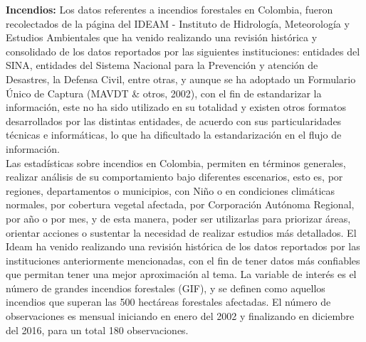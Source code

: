 \documentclass[a4paper]{article}\usepackage[]{graphicx}\usepackage[]{color}
\begin{document}
\textbf{Incendios:} Los datos referentes a incendios forestales en Colombia, fueron recolectados de la página del IDEAM - Instituto de Hidrología, Meteorología y Estudios Ambientales que ha venido realizando una revisión histórica y consolidado de los datos reportados por las siguientes instituciones: entidades del SINA, entidades del Sistema Nacional para la Prevención y atención de Desastres, la Defensa Civil, entre otras, y aunque se ha adoptado un Formulario Único de Captura (MAVDT \& otros, 2002), con el fin de estandarizar la información, este no ha sido utilizado en su totalidad y existen otros formatos desarrollados por las distintas entidades, de acuerdo con sus particularidades técnicas e informáticas, lo que ha dificultado la estandarización en el flujo de información.
\\
Las estadísticas sobre incendios en Colombia, permiten en términos generales, realizar análisis de su comportamiento bajo diferentes escenarios, esto es, por regiones, departamentos o municipios, con Niño o en condiciones climáticas normales,  por cobertura vegetal afectada, por Corporación Autónoma Regional, por año o por mes, y de esta manera, poder ser  utilizarlas para priorizar áreas, orientar acciones o sustentar la necesidad de realizar estudios más detallados. El Ideam ha venido realizando una revisión histórica de los datos reportados por las instituciones anteriormente mencionadas, con el fin de tener datos más confiables que permitan tener una mejor aproximación al tema. La variable de interés es el número de grandes incendios forestales (GIF), y se definen como aquellos incendios que superan las 500 hectáreas forestales afectadas. El número de observaciones es mensual iniciando en enero del 2002 y finalizando en diciembre del 2016, para un total 180 observaciones.
\end{document}
